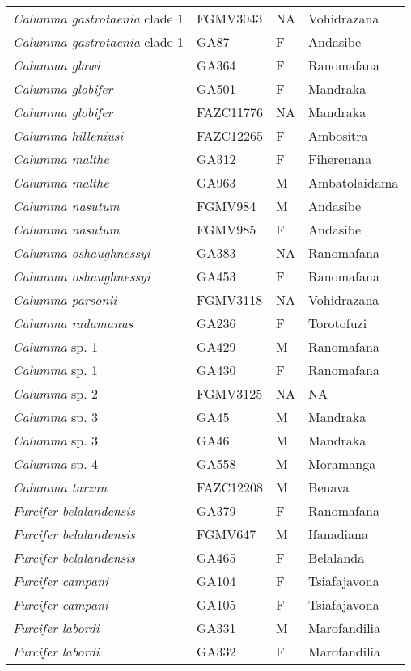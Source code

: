 \begin{longtable}{llll}
\textit{Calumma gastrotaenia} clade 1 & FGMV3043 & NA & Vohidrazana\\
\textit{Calumma gastrotaenia} clade 1 & GA87 & F & Andasibe\\
\textit{Calumma glawi} & GA364 & F & Ranomafana\\
\textit{Calumma globifer} & GA501 & F & Mandraka\\
\textit{Calumma globifer} & FAZC11776 & NA & Mandraka\\
\textit{Calumma hilleniusi} & FAZC12265 & F & Ambositra\\
\textit{Calumma malthe} & GA312 & F & Fiherenana\\
\textit{Calumma malthe} & GA963 & M & Ambatolaidama\\
\textit{Calumma nasutum} & FGMV984 & M & Andasibe\\
\textit{Calumma nasutum} & FGMV985 & F & Andasibe\\
\textit{Calumma oshaughnessyi} & GA383 & NA & Ranomafana\\
\textit{Calumma oshaughnessyi} & GA453 & F & Ranomafana\\
\textit{Calumma parsonii} & FGMV3118 & NA & Vohidrazana\\
\textit{Calumma radamanus} & GA236 & F & Torotofuzi\\
\textit{Calumma} sp. 1 & GA429 & M & Ranomafana\\
\textit{Calumma} sp. 1 & GA430 & F & Ranomafana\\
\textit{Calumma} sp. 2 & FGMV3125 & NA & NA\\
\textit{Calumma} sp. 3 & GA45 & M & Mandraka\\
\textit{Calumma} sp. 3 & GA46 & M & Mandraka\\
\textit{Calumma} sp. 4 & GA558 & M & Moramanga\\
\textit{Calumma tarzan} & FAZC12208 & M & Benava\\
\hline
\textit{Furcifer belalandensis} & GA379 & F & Ranomafana\\
\textit{Furcifer belalandensis} & FGMV647 & M & Ifanadiana\\
\textit{Furcifer belalandensis} & GA465 & F & Belalanda\\
\textit{Furcifer campani} & GA104 & F & Tsiafajavona\\
\textit{Furcifer campani} & GA105 & F & Tsiafajavona\\
\textit{Furcifer labordi} & GA331 & M & Marofandilia\\
\textit{Furcifer labordi} & GA332 & F & Marofandilia\\

\end{longtable}
